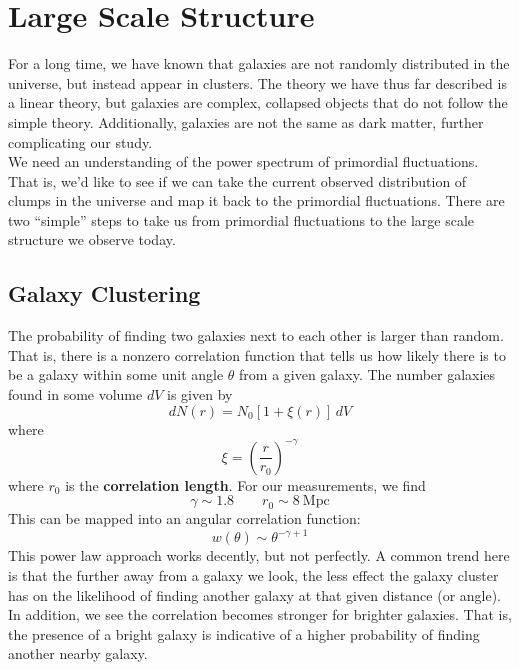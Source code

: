 \documentclass[10pt]{article}
\numberwithin{equation}{section}
\newcommand{\n}{\noindent}
\begin{document}

\section{Large Scale Structure} %
\label{sec:large_scale_structure}
	For a long time, we have known that galaxies are not randomly distributed in the universe, but instead appear in clusters. The theory we have thus far described is a linear theory, but galaxies are complex, collapsed objects that do not follow the simple theory. Additionally, galaxies are not the same as dark matter, further complicating our study.\\
	
	\n We need an understanding of the power spectrum of primordial fluctuations. That is, we'd like to see if we can take the current observed distribution of clumps in the universe and map it back to the primordial fluctuations. There are two ``simple'' steps to take us from primordial fluctuations to the large scale structure we observe today.\\
	
	\subsection{Galaxy Clustering} %
	\label{sub:galaxy_clustering}
		The probability of finding two galaxies next to each other is larger than random. That is, there is a nonzero correlation function that tells us how likely there is to be a galaxy within some unit angle $\theta$ from a given galaxy. The number galaxies found in some volume $dV$ is given by
		\begin{equation}
			\label{eq:large:1} dN(r) = N_0\left[1+\xi(r)\right]\,dV
		\end{equation}
		where
		\begin{equation}
			\label{eq:large:2} \xi = \left(\frac{r}{r_0}\right)^{-\gamma}
		\end{equation}
		where $r_0$ is the \textbf{correlation length}. For our measurements, we find
		\begin{equation}
			\label{eq:large:3} \gamma\sim 1.8 \qquad r_0\sim 8\ \mathrm{Mpc}
		\end{equation}
		This can be mapped into an angular correlation function:
		\begin{equation}
			\label{eq:large:4} w(\theta) \sim \theta^{-\gamma+1}
		\end{equation}
		This power law approach works decently, but not perfectly. A common trend here is that the further away from a galaxy we look, the less effect the galaxy cluster has on the likelihood of finding another galaxy at that given distance (or angle). In addition, we see the correlation becomes stronger for brighter galaxies. That is, the presence of a bright galaxy is indicative of a higher probability of finding another nearby galaxy.\\
		
\end{document}
